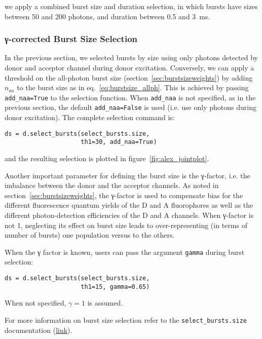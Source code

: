 we apply a combined burst size and duration selection, in which bursts
have sizes between 50 and 200 photons, and duration between 0.5 and 3~ms.

\subsubsection{γ-corrected Burst Size Selection}

In the previous section, we selected bursts by size using only photons
detected by donor and acceptor channel during donor excitation.
Conversely, we can apply a threshold on the all-photon burst size
(section~\ref{sec:burstsizeweights}) by adding $n_{aa}$ to the burst size
as in eq.~\ref{eq:burstsize_allph}. This is achieved
by passing \verb|add_naa=True| to the selection function. When \verb|add_naa| is not specified,
as in the previous section, the default \verb|add_naa=False| is used
(i.e. use only photons during donor excitation). The complete selection command
is:

\begin{lstlisting}
ds = d.select_bursts(select_bursts.size,
                     th1=30, add_naa=True)
\end{lstlisting}

\noindent and the resulting selection is plotted in figure~\ref{fig:alex_jointplot}.

Another important parameter for defining the burst size is the γ-factor, i.e.
the imbalance between the donor and the acceptor channels. As noted in
section~\ref{sec:burstsizeweights}, the γ-factor is
used to compensate bias for the different fluorescence quantum yields of the D and A
fluorophores as well as the different photon-detection efficiencies of the D and A channels.
When γ-factor is not 1, neglecting its effect on burst size leads to
over-representing (in terms of number of bursts) one population versus to the others.

When the γ factor is known, users can pass the argument
\verb|gamma| during burst selection:

\begin{lstlisting}
ds = d.select_bursts(select_bursts.size,
                     th1=15, gamma=0.65)
\end{lstlisting}

When not specified, $\gamma=1$ is assumed.

For more information on burst size selection refer to the
\verb|select_bursts.size| documentation
(\href{http://fretbursts.readthedocs.org/en/latest/burst_selection.html#fretbursts.select_bursts.size}{link}).

